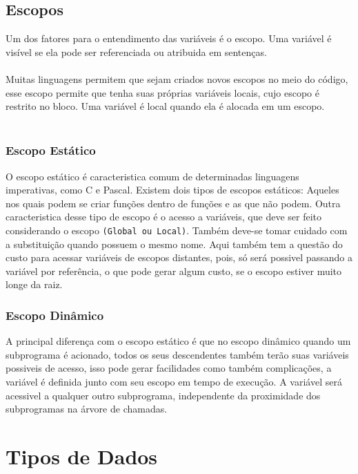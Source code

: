 \documentclass[12pt, onecolumn]{article}
\begin{document}
		\subsection{Escopos}
	
	Um dos fatores para o entendimento das variáveis é o escopo. Uma variável
	é visível se ela pode ser referenciada ou atribuida em sentenças.\\
	\\
	Muitas linguagens permitem que sejam criados novos escopos no
	meio do código, esse escopo permite que tenha suas próprias variáveis locais, 
	cujo escopo é restrito no bloco. Uma variável é local quando ela é alocada 
	em um escopo.\\
	\\
		\subsubsection{Escopo Estático}
	
	O escopo estático é caracteristica comum de determinadas linguagens 
	imperativas, como C e Pascal. Existem dois tipos de escopos estáticos:
	Aqueles nos quais podem se criar funções dentro de funções e as que não
	podem. Outra caracteristica desse tipo de escopo é o acesso a variáveis,
	que deve ser feito considerando o escopo \texttt{(Global ou Local)}. 
	Também deve-se tomar cuidado com a substituição quando possuem o mesmo
	nome. Aqui também tem a questão do custo para acessar variáveis de escopos
	distantes, pois, só será possivel passando a variável por referência, 
	o que pode gerar algum custo, se o escopo estiver muito longe da raiz.
		
		\subsubsection{Escopo Dinâmico}
	
	A principal diferença com o escopo estático é que no escopo dinâmico 
	quando um subprograma é acionado, todos os seus descendentes também 
	terão suas variáveis possiveis de acesso, isso pode gerar facilidades
	como também complicações, a variável é definida junto com seu escopo
	em tempo de execução. A variável será acessivel a qualquer outro 
	subprograma, independente da proximidade dos subprogramas na árvore
	de chamadas.


		\section{Tipos de Dados}	
	
\end{document}
